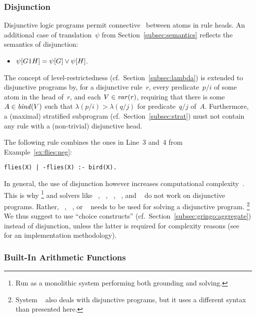 \subsubsection{Disjunction}\label{subsec:gringo:disjunction}

Disjunctive logic programs permit connective~\code{|} between atoms in rule heads.
An additional case of translation~$\psi$ from Section~\ref{subsec:semantics}
reflects the semantics of disjunction:
\begin{itemize}
\item $\psi[G\code{|}H]=\psi[G]\vee\psi[H]$.
\end{itemize}
%
The concept of level-restrictedness (cf.\ Section~\ref{subsec:lambda}) is extended
to disjunctive programs by,
for a disjunctive rule~$r$, every predicate~$p/i$
of some atom in the head of~$r$, and each $V\in\vars{r}$,
requiring that there is some $A\in\binders{V}{r}$ such that
$\lambda(p/i)>\lambda(q/j)$ for predicate~$q/j$ of~$A$.
Furthermore, a (maximal) stratified subprogram (cf.\ Section~\ref{subsec:strat})
must not contain any rule with a (non-trivial) disjunctive head.

The following rule combines the ones in Line~3 and~4 from Example~\ref{ex:flies:neg}:
\begin{lstlisting}[numbers=none]
flies(X) | -flies(X) :- bird(X).
\end{lstlisting}
In general, the use of disjunction however increases
computational complexity~\cite{eitgot95a}.
This is why \clingo%
\footnote{Run as a monolithic system performing both grounding and solving.}
and solvers like 
\assat~\cite{linzha04a},
\clasp~\cite{gekanesc07b},
\nomorepp~\cite{angelinesc05c},
\smodels~\cite{siniso02a}, and
\smodelscc~\cite{warsch04a}
do not work on disjunctive programs.
Rather,
\claspD~\cite{drgegrkakoossc08a},
\cmodels~\cite{gilima06a,lierler05a}, or
\gnt~\cite{janisesiyo06a}
needs to be used for solving a disjunctive program.%
\footnote{System \dlv~\cite{dlv03a} also deals with disjunctive programs,
  but it uses a different syntax than presented here.}
We thus suggest to use ``choice constructs'' (cf.\ Section~\ref{subsec:gringo:aggregate})
instead of disjunction, unless the latter is required for complexity reasons
(see~\cite{eitpol06a} for an implementation methodology).


\subsubsection{Built-In Arithmetic Functions}\label{subsec:gringo:arith}

